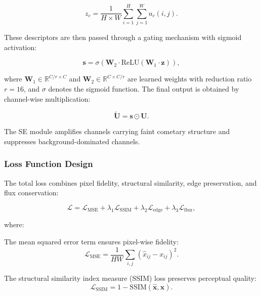 \documentclass[preprint2]{aastex631}
\begin{document}
\begin{equation}\label{eq:se_squeeze}
z_c = \frac{1}{H \times W} \sum_{i=1}^{H} \sum_{j=1}^{W} u_c(i, j).
\end{equation}

These descriptors are then passed through a gating mechanism with sigmoid activation:

\begin{equation}\label{eq:se_excitation}
\mathbf{s} = \sigma\left(\mathbf{W}_2 \cdot \text{ReLU}\left(\mathbf{W}_1 \cdot \mathbf{z}\right)\right),
\end{equation}

where $\mathbf{W}_1 \in \mathbb{R}^{C/r \times C}$ and $\mathbf{W}_2 \in \mathbb{R}^{C \times C/r}$ are learned weights with reduction ratio $r=16$, and $\sigma$ denotes the sigmoid function. The final output is obtained by channel-wise multiplication:

\begin{equation}\label{eq:se_scale}
\tilde{\mathbf{U}} = \mathbf{s} \odot \mathbf{U}.
\end{equation}

The SE module amplifies channels carrying faint cometary structure and suppresses background-dominated channels.

\subsubsection{Loss Function Design}

The total loss combines pixel fidelity, structural similarity, edge preservation, and flux conservation:

\begin{equation}\label{eq:total_loss}
\mathcal{L} = \mathcal{L}_{\text{MSE}} + \lambda_1 \mathcal{L}_{\text{SSIM}} + \lambda_2 \mathcal{L}_{\text{edge}} + \lambda_3 \mathcal{L}_{\text{flux}},
\end{equation}

where:

The mean squared error term ensures pixel-wise fidelity:
\begin{equation}\label{eq:mse_loss}
\mathcal{L}_{\text{MSE}} = \frac{1}{HW} \sum_{i,j} (\hat{x}_{ij} - x_{ij})^2.
\end{equation}

The structural similarity index measure (SSIM) loss \citep{wang04} preserves perceptual quality:
\begin{equation}\label{eq:ssim_loss}
\mathcal{L}_{\text{SSIM}} = 1 - \text{SSIM}(\hat{\mathbf{x}}, \mathbf{x}).
\end{equation}
\end{document}
